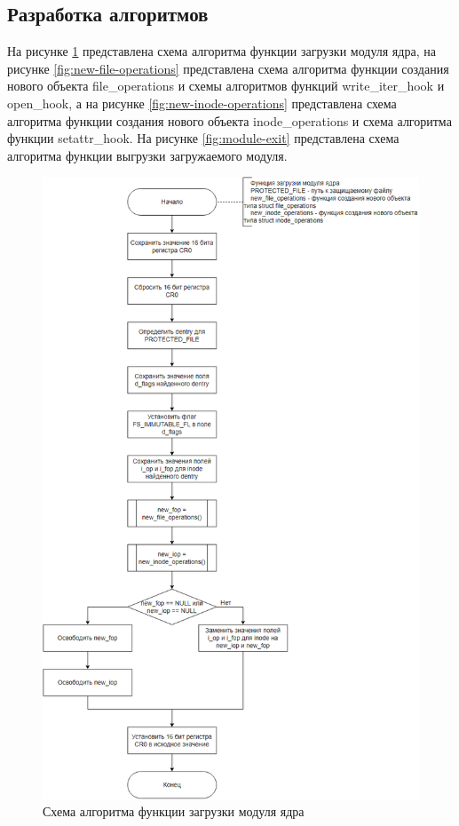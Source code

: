 \subsection{Разработка алгоритмов}

На рисунке \ref{fig:module-init} представлена схема алгоритма функции загрузки модуля ядра, на рисунке \ref{fig:new-file-operations} представлена схема алгоритма функции создания нового объекта file\_operations и схемы алгоритмов функций write\_iter\_hook и open\_hook, а на рисунке \ref{fig:new-inode-operations} представлена схема алгоритма функции создания нового объекта inode\_operations и схема алгоритма функции setattr\_hook. 
На рисунке \ref{fig:module-exit} представлена схема алгоритма функции выгрузки загружаемого модуля.

\begin{figure}[h]
	\centering
	\captionsetup{justification=centering}
	\includegraphics[width=150mm]{img/module_init.png}
	\caption{Схема алгоритма функции загрузки модуля ядра}
	\label{fig:module-init}
\end{figure}

